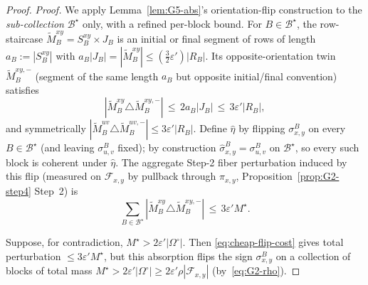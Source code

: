 \begin{proof}
\emph{Proof.} We apply Lemma~\ref{lem:G5-abs}'s orientation-flip construction
to the \emph{sub-collection} $\mathcal B^\star$ only, with a refined per-block
bound. For $B\in\mathcal B^\star$, the row-staircase $\tilde M_B^{xy}=S_B^{xy}\times J_B$
is an initial or final segment of rows of length $a_B:=|S_B^{xy}|$ with
$a_B|J_B|=|\tilde M_B^{xy}|\le(\tfrac32\varepsilon')|R_B|$. Its
opposite-orientation twin $\tilde M_B^{xy,-}$ (segment of the same length $a_B$
but opposite initial/final convention) satisfies
\[
|\tilde M_B^{xy}\triangle\tilde M_B^{xy,-}|\,\le\,2a_B|J_B|\,\le\,3\varepsilon'|R_B|,
\]
and symmetrically $|\tilde M_B^{uv}\triangle\tilde M_B^{uv,-}|\le 3\varepsilon'|R_B|$.
Define $\hat\eta$ by flipping $\sigma_{x,y}^B$ on every $B\in\mathcal B^\star$
(and leaving $\sigma_{u,v}^B$ fixed); by construction
$\hat\sigma_{x,y}^B=\sigma_{u,v}^B$ on $\mathcal B^\star$, so every such block
is coherent under $\hat\eta$. The aggregate Step-2 fiber perturbation induced
by this flip (measured on $\mathcal F_{x,y}$ by pullback through $\pi_{x,y}$,
Proposition~\ref{prop:G2-step4} Step~2) is
\begin{equation}\label{eq:cheap-flip-cost}
\sum_{B\in\mathcal B^\star}|\tilde M_B^{xy}\triangle\tilde M_B^{xy,-}|\,\le\,3\varepsilon'M^\star.
\end{equation}

Suppose, for contradiction, $M^\star>2\varepsilon'|\Omega^\circ|$. Then
\eqref{eq:cheap-flip-cost} gives total perturbation $\le 3\varepsilon'M^\star$,
but this absorption flips the sign $\sigma_{x,y}^B$ on a collection of blocks
of total mass $M^\star>2\varepsilon'|\Omega^\circ|\ge 2\varepsilon'\rho|\mathcal F_{x,y}|$
(by~\eqref{eq:G2-rho}).


\end{proof}
